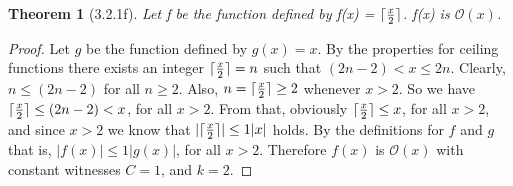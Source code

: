 \documentclass[a4paper, 12pt]{article}
\theoremstyle{plain}
\newtheorem*{theorem*}{Theorem}
\DeclarePairedDelimiter{\ceil}{\lceil}{\rceil}
\begin{document}
	
	\begin{theorem*}[3.2.1f]
		Let f be the function defined by f(x) = $\ceil{\frac{x}{2}}$. \newline f(x) is $\mathcal{O} (x)$.
	\end{theorem*}
	
	\begin{proof}
		Let $g$ be the function defined by $g(x) = x$. 
		By the properties for ceiling functions 
		there exists an integer 
		$\ceil{\frac{x}{2}} = n$ 
		such that $(2n-2) < x \le 2n$. 
		Clearly, $n \le (2n-2)$ for all $n \ge 2$. 
		Also, $n = \ceil{\frac{x}{2}} \ge 2$ whenever $x > 2$. So we have $\ceil{\frac{x}{2}} \le (2n-2) < x$, for all $x > 2$. From that, obviously $\ceil{\frac{x}{2}} \le x$, for all $x > 2$, and since $x > 2$ we know that $|\ceil{\frac{x}{2}}| \le 1|x|$ holds. By the definitions for $f$ and $g$ that is, $|f(x)| \le 1|g(x)|$, for all $x > 2$. Therefore $f(x)$ is $\mathcal{O}(x)$ with constant witnesses $C = 1$, and $k = 2$.
	\end{proof}
\end{document}
